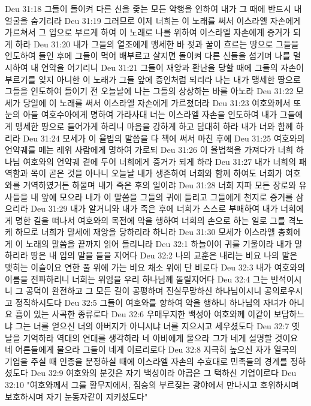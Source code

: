 Deu 31:18  그들이 돌이켜 다른 신을 좇는 모든 악행을 인하여 내가 그 때에 반드시 내 얼굴을 숨기리라
Deu 31:19  그러므로 이제 너희는 이 노래를 써서 이스라엘 자손에게 가르쳐서 그 입으로 부르게 하여 이 노래로 나를 위하여 이스라엘 자손에게 증거가 되게 하라
Deu 31:20  내가 그들의 열조에게 맹세한 바 젖과 꿀이 흐르는 땅으로 그들을 인도하여 들인 후에 그들이 먹어 배부르고 살지면 돌이켜 다른 신들을 섬기며 나를 멸시하여 내 언약을 어기리니
Deu 31:21  그들이 재앙과 환난을 당할 때에 그들의 자손이 부르기를 잊지 아니한 이 노래가 그들 앞에 증인처럼 되리라 나는 내가 맹세한 땅으로 그들을 인도하여 들이기 전 오늘날에 나는 그들의 상상하는 바를 아노라
Deu 31:22  모세가 당일에 이 노래를 써서 이스라엘 자손에게 가르쳤더라
Deu 31:23  여호와께서 또 눈의 아들 여호수아에게 명하여 가라사대 너는 이스라엘 자손을 인도하여 내가 그들에게 맹세한 땅으로 들어가게 하리니 마음을 강하게 하고 담대히 하라 내가 너와 함께 하리라
Deu 31:24  모세가 이 율법의 말씀을 다 책에 써서 마친 후에
Deu 31:25  여호와의 언약궤를 메는 레위 사람에게 명하여 가로되
Deu 31:26  이 율법책을 가져다가 너희 하나님 여호와의 언약궤 곁에 두어 너희에게 증거가 되게 하라
Deu 31:27  내가 너희의 패역함과 목이 곧은 것을 아나니 오늘날 내가 생존하여 너희와 함께 하여도 너희가 여호와를 거역하였거든 하물며 내가 죽은 후의 일이랴
Deu 31:28  너희 지파 모든 장로와 유사들을 내 앞에 모으라 내가 이 말씀을 그들의 귀에 들리고 그들에게 천지로 증거를 삼으리라
Deu 31:29  내가 알거니와 내가 죽은 후에 너희가 스스로 부패하여 내가 너희에게 명한 길을 떠나서 여호와의 목전에 악을 행하여 너희의 손으로 하는 일로 그를 격노케 하므로 너희가 말세에 재앙을 당하리라 하니라
Deu 31:30  모세가 이스라엘 총회에게 이 노래의 말씀을 끝까지 읽어 들리니라
Deu 32:1  하늘이여 귀를 기울이라 내가 말하리라 땅은 내 입의 말을 들을 지어다
Deu 32:2  나의 교훈은 내리는 비요 나의 말은 맺히는 이슬이요 연한 풀 위에 가는 비요 채소 위에 단 비로다
Deu 32:3  내가 여호와의 이름을 전파하리니 너희는 위엄을 우리 하나님께 돌릴지어다
Deu 32:4  그는 반석이시니 그 공덕이 완전하고 그 모든 길이 공평하며 진실무망하신 하나님이시니 공의로우시고 정직하시도다
Deu 32:5  그들이 여호와를 향하여 악을 행하니 하나님의 자녀가 아니요 흠이 있는 사곡한 종류로다
Deu 32:6  우매무지한 백성아 여호와께 이같이 보답하느냐 그는 너를 얻으신 너의 아버지가 아니시냐 너를 지으시고 세우셨도다
Deu 32:7  옛날을 기억하라 역대의 연대를 생각하라 네 아비에게 물으라 그가 네게 설명할 것이요 네 어른들에게 물으라 그들이 네게 이르리로다
Deu 32:8  지극히 높으신 자가 열국의 기업을 주실 때 인종을 분정하실 때에 이스라엘 자손의 수효대로 민족들의 경계를 정하셨도다
Deu 32:9  여호와의 분깃은 자기 백성이라 야곱은 그 택하신 기업이로다
Deu 32:10  "여호와께서 그를 황무지에서, 짐승의 부르짖는 광야에서 만나시고 호위하시며 보호하시며 자기 눈동자같이 지키셨도다"
